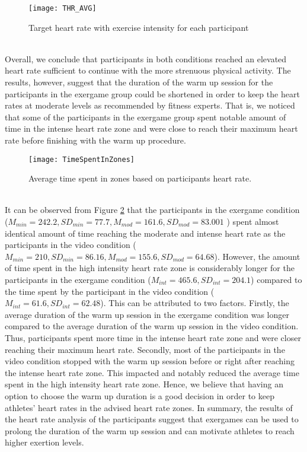 \begin{figure}[h]
    \centering
    \texttt{[image: THR\_AVG]}
    \caption{Target heart rate with exercise intensity for each participant}
    \label{fig:hrzones}
\end{figure}\\
Overall, we conclude that  participants in both conditions reached an elevated heart rate sufficient to continue with the more strenuous physical activity. The results, however, suggest that the duration  of the warm up session for the participants in the exergame group could be shortened in order to keep the heart rates at moderate levels as recommended by fitness experts. That is, we noticed that some of the participants in the exergame group spent notable amount of time in the intense heart rate zone and were close to reach their maximum heart rate before finishing with the warm up procedure.
\begin{figure}[h]
    \centering
    \texttt{[image: TimeSpentInZones]}
    \caption{Average time spent in zones based on participants heart rate.}
    \label{fig:zonesTime}
\end{figure}\\
It can be observed from Figure  \ref{fig:zonesTime} that the participants in the exergame condition (\begin{math} M_{min}=242.2, SD_{min}=77.7, M_{mod}=161.6 , SD_{mod}=83.001 \end{math} ) spent almost identical amount of time reaching the moderate and intense heart rate as the participants in the video condition (\begin{math}  M_{min}=210 , SD_{min}=86.16, M_{mod}=155.6 , SD_{mod}=64.68 \end{math}). However, the amount of time spent in the high intensity heart rate zone is considerably longer for the participants in the exergame condition (\begin{math}  M_{int}=465.6 , SD_{int}=204.1\end{math}) compared to the time spent by the participant in the video condition (\begin{math}M_{int}=61.6 , SD_{int}=62.48 \end{math}). This can be attributed to two factors. Firstly, the average duration of the warm up session in the exergame condition was longer compared to the average duration of the warm up session in the video condition. Thus, participants spent more time in the intense heart rate zone and were closer reaching their maximum heart rate. Secondly, most of the participants in the video condition stopped with the warm up session before or right after reaching the intense heart rate zone. This impacted and notably reduced the average time spent in the high intensity heart rate zone. Hence, we believe that having an option to choose the warm up duration is a good decision in order to keep athletes' heart rates in the advised heart rate zones. In summary, the results of the heart rate analysis of the participants suggest that exergames can be used to prolong the duration of the warm up session and can motivate athletes to reach higher exertion levels. 
